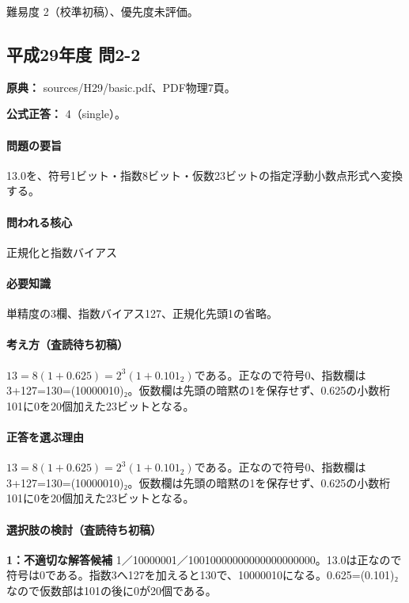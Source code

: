 \par 難易度 2（校準初稿）、優先度未評価。

\subsection{平成29年度 問2-2}
\label{q:h29-reg-basic-2-2}

\noindent\textbf{原典：} sources/H29/basic.pdf、PDF物理7頁。

\textbf{公式正答：} 4（single）。

\paragraph{問題の要旨} 13.0を、符号1ビット・指数8ビット・仮数23ビットの指定浮動小数点形式へ変換する。

\paragraph{問われる核心} 正規化と指数バイアス

\paragraph{必要知識} 単精度の3欄、指数バイアス127、正規化先頭1の省略。

\paragraph{考え方（査読待ち初稿）} \(13=8(1+0.625)=2^3(1+0.101_2)\)である。正なので符号0、指数欄は3+127=130=(10000010)₂。仮数欄は先頭の暗黙の1を保存せず、0.625の小数桁101に0を20個加えた23ビットとなる。

\paragraph{正答を選ぶ理由} \(13=8(1+0.625)=2^3(1+0.101_2)\)である。正なので符号0、指数欄は3+127=130=(10000010)₂。仮数欄は先頭の暗黙の1を保存せず、0.625の小数桁101に0を20個加えた23ビットとなる。

\paragraph{選択肢の検討（査読待ち初稿）}

\noindent\textbf{1：不適切な解答候補} 1／10000001／10010000000000000000000。13.0は正なので符号は0である。指数3へ127を加えると130で、10000010になる。0.625=(0.101)₂なので仮数部は101の後に0が20個である。\par

